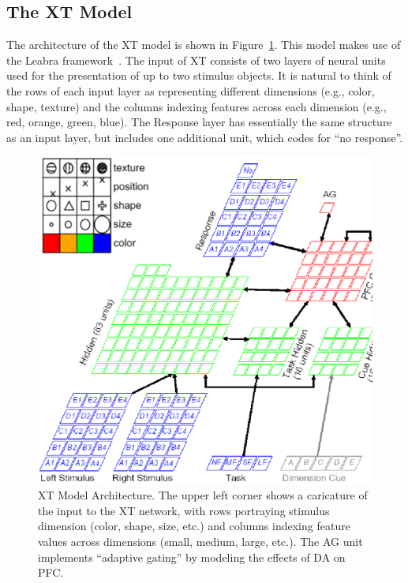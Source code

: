 \subsection{The XT Model} 


The architecture of the XT model is shown in Figure~\ref{xt-layout-figure}. This model makes use of the Leabra framework~\cite{OReillyRC:2000:Computational}. The input of XT consists of two layers of neural units used for the presentation of up to two stimulus objects. It is natural to think of the rows of each input layer as representing different dimensions (e.g., color, shape, texture) and the columns indexing features across each dimension (e.g., red, orange, green, blue). The Response layer has essentially the same structure as an input layer, but includes one additional unit, which codes for ``no response''.  

\begin{figure}
\begin{center}
	\includegraphics[width=125mm]{figures/xt_arch_2.ps}
\end{center}
\caption{XT Model Architecture. The upper left corner shows a
         caricature of the input to the XT network, with rows
         portraying stimulus dimension (color, shape, size, etc.) and
         columns indexing feature values across dimensions (small,
         medium, large, etc.). The AG unit implements ``adaptive gating'' 
	 by modeling the effects of DA on PFC.}
\label{xt-layout-figure}
\end{figure} 

